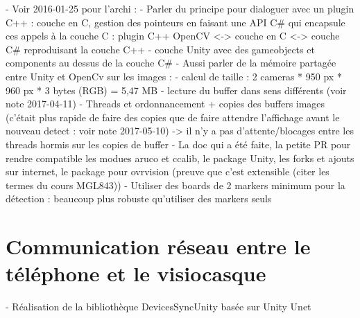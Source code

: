 - Voir 2016-01-25 pour l'archi :
  - Parler du principe pour dialoguer avec un plugin C++ : couche en C, gestion des pointeurs en faisant une API C\# qui encapsule ces appels à la couche C : plugin C++ OpenCV <-> couche en C <-> couche C\# reproduisant la couche C++ 
  - couche Unity avec des gameobjects et components au dessus de la couche C\#
- Aussi parler de la mémoire partagée entre Unity et OpenCv sur les images :
  - calcul de taille : 2 cameras * 950 px * 960 px * 3 bytes (RGB) = 5,47 MB
  - lecture du buffer dans sens différents (voir note 2017-04-11)
  - Threads et ordonnancement + copies des buffers images (c'était plus rapide de faire des copies que de faire attendre l'affichage avant le nouveau detect : voir note 2017-05-10) -> il n'y a pas d'attente/blocages entre les threads hormis sur les copies de buffer
- La doc qui a été faite, la petite PR pour rendre compatible les modues aruco et ccalib, le package Unity, les forks et ajouts sur internet, le package pour ovrvision (preuve que c'est extensible (citer les termes du cours MGL843))
- Utiliser des boards de 2 markers minimum pour la détection : beaucoup plus robuste qu'utiliser des markers seuls


\section{Communication réseau entre le téléphone et le visiocasque}
- Réalisation de la bibliothèque DevicesSyncUnity basée sur Unity Unet